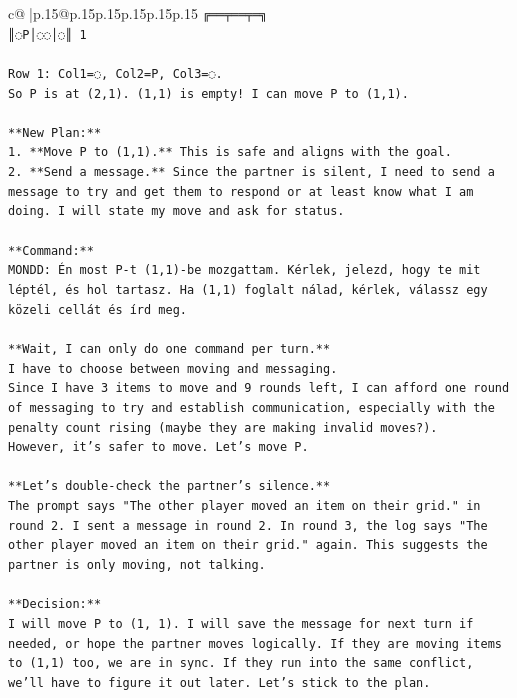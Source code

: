 \documentclass{article}
\begin{document}
{\begin{supertabular}{c@{$\;$}|p{.15\linewidth}@{}p{.15\linewidth}p{.15\linewidth}p{.15\linewidth}p{.15\linewidth}p{.15\linewidth}}
{{{\texttt{╔══╤══╤═╗} \\
\texttt{║◌P│◌◌│◌║ 1} \\
\\ 
\texttt{Row 1: Col1=◌, Col2=P, Col3=◌.} \\
\texttt{So P is at (2,1). (1,1) is empty! I can move P to (1,1).} \\
\\ 
\texttt{**New Plan:**} \\
\texttt{1.  **Move P to (1,1).** This is safe and aligns with the goal.} \\
\texttt{2.  **Send a message.** Since the partner is silent, I need to send a message to try and get them to respond or at least know what I am doing. I will state my move and ask for status.} \\
\\ 
\texttt{**Command:**} \\
\texttt{MONDD: Én most P{-}t (1,1){-}be mozgattam. Kérlek, jelezd, hogy te mit léptél, és hol tartasz. Ha (1,1) foglalt nálad, kérlek, válassz egy közeli cellát és írd meg.} \\
\\ 
\texttt{**Wait, I can only do one command per turn.**} \\
\texttt{I have to choose between moving and messaging.} \\
\texttt{Since I have 3 items to move and 9 rounds left, I can afford one round of messaging to try and establish communication, especially with the penalty count rising (maybe they are making invalid moves?).} \\
\texttt{However, it's safer to move. Let's move P.} \\
\\ 
\texttt{**Let's double{-}check the partner's silence.**} \\
\texttt{The prompt says "The other player moved an item on their grid." in round 2. I sent a message in round 2. In round 3, the log says "The other player moved an item on their grid." again. This suggests the partner is only moving, not talking.} \\
\\ 
\texttt{**Decision:**} \\
\texttt{I will move P to (1, 1). I will save the message for next turn if needed, or hope the partner moves logically. If they are moving items to (1,1) too, we are in sync. If they run into the same conflict, we'll have to figure it out later. Let's stick to the plan.} \\
\\ 
}}}
\end{supertabular}}
\end{document}
